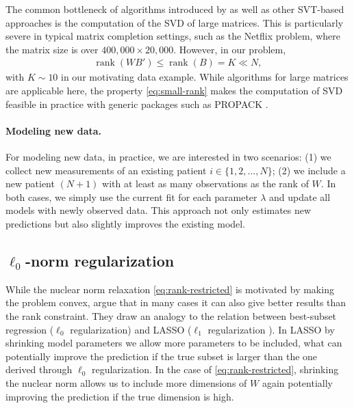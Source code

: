 \documentclass[preprint]{imsart}
\numberwithin{equation}{section}
\theoremstyle{plain}
\newcommand{\tr}[1]{{\textcolor{red}{#1}}}
\DeclareMathOperator*{\rank}{rank}
\begin{document}
The common bottleneck of algorithms introduced by \citet{cai2010singular,mazumder2010spectral,ma2011fixed} as well as other SVT-based approaches is the computation of the SVD of large matrices. This is particularly severe in typical matrix completion settings, such as the Netflix problem, where the matrix size is over $400{,}000 \times 20{,}000$. However, in our problem,
\begin{align}\label{eq:small-rank}
  \rank(WB') \leq \rank(B) = K \ll N,
\end{align}
with $K \sim 10$ in our motivating data example. While algorithms for large matrices are applicable here, the property \eqref{eq:small-rank} makes the computation of SVD feasible in practice with generic packages such as PROPACK \citep{larsen2004propack}.

\paragraph{Modeling new data.}

For modeling new data, in practice, we are interested in two scenarios: (1) we collect new measurements of an existing patient $i \in \{1,2,...,N\}$; (2) we include a new patient $(N+1)$ with at least as many observations as the rank of $W$. In both cases, we simply use the current fit for each parameter $\lambda$ and update all models with newly observed data. This approach not only estimates new predictions but also slightly improves the existing model. 




\subsection{$\ell_0$-norm regularization}

While the nuclear norm relaxation \eqref{eq:rank-restricted} is motivated by making the problem convex, \citet{mazumder2010spectral} argue that in many cases it can also give better results than the rank constraint. They draw an analogy to the relation between best-subset regression ($\ell_0$ regularization) and LASSO ($\ell_1$ regularization \citep{tibshirani1996regression, friedman2001elements}). In LASSO by shrinking model parameters we allow more parameters to be included, what can potentially improve the prediction if the true subset is larger than the one derived through $\ell_0$ regularization. In the case of \eqref{eq:rank-restricted}, shrinking the nuclear norm allows us to include more dimensions of $W$ again potentially improving the prediction if the true dimension is high.
\end{document}
